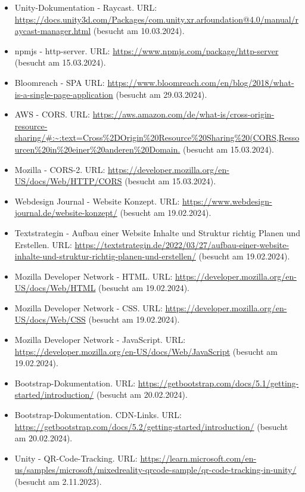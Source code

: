 \begin{itemize}[leftmargin=0pt]
    \item Unity-Dokumentation - Raycast. {\scriptsize URL:} \url{https://docs.unity3d.com/Packages/com.unity.xr.arfoundation@4.0/manual/raycast-manager.html} (besucht am 10.03.2024).
    \item npmjs - http-server. {\scriptsize URL:} \url{https://www.npmjs.com/package/http-server} (besucht am 15.03.2024).
    \item Bloomreach - SPA {\scriptsize URL:} \url{https://www.bloomreach.com/en/blog/2018/what-is-a-single-page-application} (besucht am 29.03.2024).
    \item AWS - CORS. {\scriptsize URL:} \url{https://aws.amazon.com/de/what-is/cross-origin-resource-sharing/#:~:text=Cross%2DOrigin%20Resource%20Sharing%20(CORS,Ressourcen%20in%20einer%20anderen%20Domain.} (besucht am 15.03.2024).
    \item Mozilla - CORS-2. {\scriptsize URL:} \url{https://developer.mozilla.org/en-US/docs/Web/HTTP/CORS} (besucht am 15.03.2024).
    \item Webdesign Journal - Website Konzept. {\scriptsize URL:} \url{https://www.webdesign-journal.de/website-konzept/} (besucht am 19.02.2024).
    \item Textstrategin - Aufbau einer Website Inhalte und Struktur richtig Planen und Erstellen. {\scriptsize URL:} \url{https://textstrategin.de/2022/03/27/aufbau-einer-website-inhalte-und-struktur-richtig-planen-und-erstellen/} (besucht am 19.02.2024).
    \item Mozilla Developer Network - HTML. {\scriptsize URL:} \url{https://developer.mozilla.org/en-US/docs/Web/HTML} (besucht am 19.02.2024).
    \item Mozilla Developer Network - CSS. {\scriptsize URL:} \url{https://developer.mozilla.org/en-US/docs/Web/CSS} (besucht am 19.02.2024).
    \item Mozilla Developer Network - JavaScript. {\scriptsize URL:} \url{https://developer.mozilla.org/en-US/docs/Web/JavaScript} (besucht am 19.02.2024).
    \item Bootstrap-Dokumentation. {\scriptsize URL:} \url{https://getbootstrap.com/docs/5.1/getting-started/introduction/} (besucht am 20.02.2024).
    \item Bootstrap-Dokumentation. CDN-Links. {\scriptsize URL:} \url{https://getbootstrap.com/docs/5.2/getting-started/introduction/} (besucht am 20.02.2024).
    \item Unity - QR-Code-Tracking. {\scriptsize URL:} \url{https://learn.microsoft.com/en-us/samples/microsoft/mixedreality-qrcode-sample/qr-code-tracking-in-unity/} (besucht am 2.11.2023).

\end{itemize}
